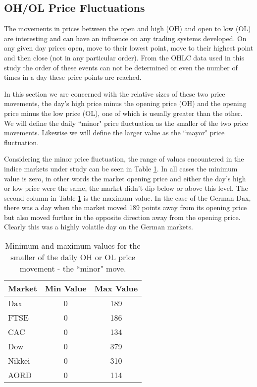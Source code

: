 \subsection{OH/OL Price Fluctuations}
The movements in prices between the open and high (OH) and open to low (OL) are interesting and can have an influence on any trading systems developed. On any given day prices open, move to their lowest point, move to their highest point and then close (not in any particular order). From the OHLC data used in this study the order of these events can not be determined or even the number of times in a day these price points are reached. 

In this section we are concerned with the relative sizes of these two price movements, the day's high price minus the opening price (OH) and the opening price minus the low price (OL), one of which is usually greater than the other. We will define the daily \textquotedblleft minor" price fluctuation as the smaller of the two price movements. Likewise we will define the larger value as the \textquotedblleft mayor" price fluctuation.

Considering the minor price fluctuation, the range of values encountered in the indice markets under study can be seen in Table \ref{tab:minorOH}. In all cases the minimum value is zero, in other words the market opening price and either the day's high or low price were the same, the market didn't dip below or above this level. The second column in Table \ref{tab:minorOH} is the maximum value. In the case of the German Dax, there was a day when the market moved 189 points away from its opening price but also moved further in the opposite direction away from the opening price. Clearly this was a highly volatile day on the German markets.

\begin{table}[!h] \centering 
  \caption[Minor daily price fluctuation.]{Minimum and maximum values for the smaller of the daily OH or OL price movement - the \textquotedblleft minor" move.} 
  \label{tab:minorOH}
\begin{tabular}{lcc} 
\toprule 
Market & Min Value & Max Value  \\ 
\midrule
Dax  & 0 & 189  \\ 
FTSE & 0 & 186  \\ 
CAC  & 0 & 134  \\ 
Dow  & 0 & 379  \\ 
Nikkei & 0 & 310  \\ 
AORD   & 0 & 114  \\ 
\bottomrule
\end{tabular} 
\end{table} 

